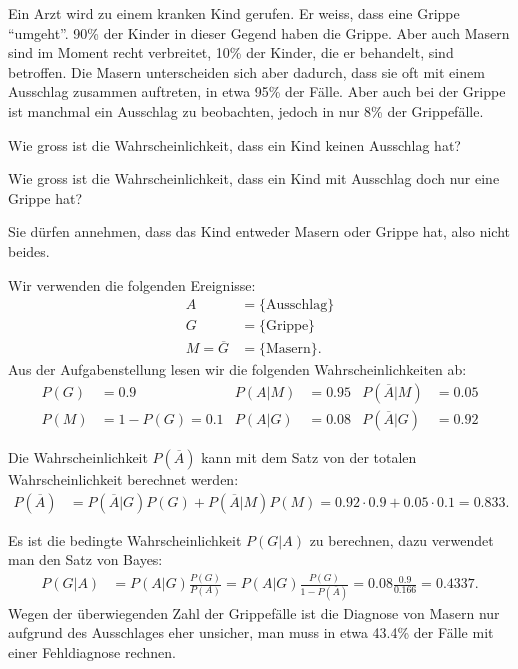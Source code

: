 Ein Arzt wird zu einem kranken Kind gerufen.
Er weiss, dass eine Grippe ``umgeht''.
90\% der Kinder in dieser Gegend haben die Grippe.
Aber auch Masern sind im Moment recht verbreitet, 10\% der Kinder,
die er behandelt, sind betroffen.
Die Masern unterscheiden sich aber dadurch, dass sie oft mit
einem Ausschlag zusammen auftreten, in etwa 95\% der Fälle.
Aber auch bei der Grippe ist manchmal ein Ausschlag zu beobachten,
jedoch in nur 8\% der Grippefälle.
\begin{teilaufgaben}
\item
Wie gross ist die Wahrscheinlichkeit, dass ein Kind keinen Ausschlag
hat?
\item
Wie gross ist die Wahrscheinlichkeit, dass ein Kind mit Ausschlag doch
nur eine Grippe hat?
\end{teilaufgaben}

\begin{hinweis}
Sie dürfen annehmen, dass das Kind entweder Masern oder Grippe hat,
also nicht beides.
\end{hinweis}

\begin{loesung}
Wir verwenden die folgenden Ereignisse:
\begin{align*}
A&=\{\text{Ausschlag}\}
\\
G&=\{\text{Grippe}\}
\\[-2pt]
M=\overline{G}&=\{\text{Masern}\}.
\end{align*}
Aus der Aufgabenstellung lesen wir die folgenden Wahrscheinlichkeiten
ab:
\begin{align*}
P(G) &= 0.9
&
P(A|M) &= 0.95
&
P(\overline{A}|M) &= 0.05
\\
P(M) &= 1-P(G) = 0.1
&
P(A|G) &= 0.08
&
P(\overline{A}|G) &= 0.92
\end{align*}
\begin{teilaufgaben}
\item
Die Wahrscheinlichkeit $P(\overline{A})$ kann mit dem Satz von der totalen
Wahrscheinlichkeit berechnet werden:
\begin{align*}
P(\overline{A})
&=
P(\overline{A}|G) P(G) + P(\overline{A}|M) P(M)
=
0.92\cdot 0.9 + 0.05\cdot 0.1
=
0.833.
\end{align*}
\item
Es ist die bedingte Wahrscheinlichkeit $P(G|A)$ zu berechnen, dazu
verwendet man den Satz von Bayes:
\begin{align*}
P(G|A)
&=
P(A|G)\frac{P(G)}{P(A)}
=
P(A|G)\frac{P(G)}{1-P(\overline{A})}
=
0.08\frac{0.9}{0.166}
=
0.4337.
\end{align*}
Wegen der überwiegenden Zahl der Grippefälle ist die Diagnose von
Masern nur aufgrund des Ausschlages eher unsicher, man muss in etwa
43.4\% der Fälle mit einer Fehldiagnose rechnen.
\qedhere
\end{teilaufgaben}
\end{loesung}

